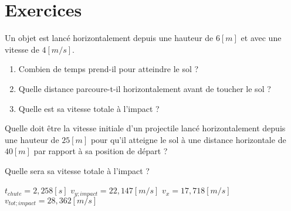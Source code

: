 
\section{Exercices}
\begin{exercise}
    Un objet est lancé horizontalement depuis une hauteur de \(6\unit{[m]}\) et avec une vitesse de \(4\unit{[m/s]}\).
    \begin{enumerate}[label=\alph*)]
        \item Combien de temps prend-il pour atteindre le sol ?
        \item Quelle distance parcoure-t-il horizontalement avant de toucher le sol ?
        \item Quelle est sa vitesse totale à l'impact ?
    \end{enumerate}
\end{exercise}

\begin{exercise}
    Quelle doit être la vitesse initiale d'un projectile lancé horizontalement depuis une hauteur de \(25[m]\) pour qu'il atteigne le sol à une distance horizontale de \(40[m]\) par rapport à sa position de départ ?

    Quelle sera sa vitesse totale à l'impact ?
\end{exercise}
\begin{solution}
    \(t_{chute}=2,258[s]\)
    \(v_{y ; impact}=22,147[m/s]\)
    \(v_x=17,718[m/s]\)
    \(v_{tot ; impact}=28,362[m/s]\)
\end{solution}

